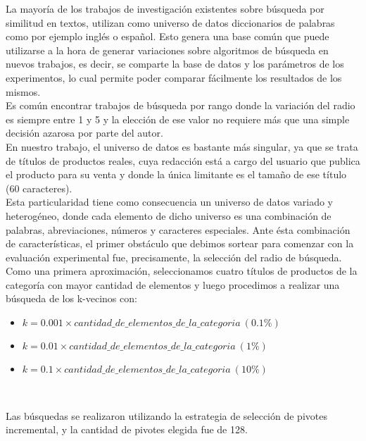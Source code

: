La mayor\'ia de los trabajos de investigaci\'on existentes sobre b\'usqueda por similitud en textos, utilizan como universo de datos diccionarios de palabras como por ejemplo ingl\'es o español. Esto genera una base com\'un que puede utilizarse a la hora de generar variaciones sobre algoritmos de b\'usqueda en nuevos trabajos, es decir, se comparte la base de datos y los par\'ametros de los experimentos, lo cual permite poder comparar f\'acilmente los resultados de los mismos.\\
 
Es com\'un encontrar trabajos de b\'usqueda por rango donde la variaci\'on del radio es siempre entre 1 y 5 y la elecci\'on de ese valor no requiere m\'as que una simple decisi\'on azarosa por parte del autor.\\

En nuestro trabajo, el universo de datos es bastante m\'as singular, ya que se trata de t\'itulos de productos reales, cuya redacci\'on est\'a a cargo del usuario que publica el producto para su venta y donde la \'unica limitante es el tama\~no de ese t\'itulo (60 caracteres).\\

Esta particularidad tiene como consecuencia un universo de datos variado y heterog\'eneo, donde cada elemento de dicho universo es una combinaci\'on de palabras, abreviaciones, n\'umeros y caracteres especiales. Ante \'esta combinaci\'on de caracter\'isticas, el primer obst\'aculo que debimos sortear para comenzar con la evaluaci\'on experimental fue, precisamente, la selecci\'on del radio de b\'usqueda.\\

Como una primera aproximaci\'on, seleccionamos cuatro t\'itulos de productos de la categor\'ia con mayor cantidad de elementos y luego procedimos a realizar una b\'usqueda de los k-vecinos con:\\

\begin{itemize}
\item $k= 0.001 \times  cantidad\_de\_elementos\_de\_la\_categoria\ (0.1\%)$
\item $k= 0.01 \times cantidad\_de\_elementos\_de\_la\_categoria\ (1\%)$
\item $k= 0.1 \times cantidad\_de\_elementos\_de\_la\_categoria\ (10\%)$
\end{itemize}

\
\

Las b\'usquedas se realizaron utilizando la estrategia de selecci\'on de pivotes incremental, y la cantidad de pivotes elegida fue de 128.\\

